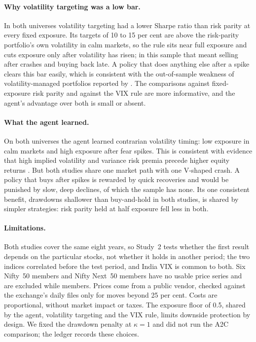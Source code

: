 \documentclass[11pt]{article}
\begin{document}
\paragraph{Why volatility targeting was a low bar.} In both universes volatility targeting had a lower Sharpe ratio than risk parity at every fixed exposure. Its targets of 10 to 15 per cent are above the risk-parity portfolio's own volatility in calm markets, so the rule sits near full exposure and cuts exposure only after volatility has risen; in this sample that meant selling after crashes and buying back late. A policy that does anything else after a spike clears this bar easily, which is consistent with the out-of-sample weakness of volatility-managed portfolios reported by \citet{cederburg2020}. The comparisons against fixed-exposure risk parity and against the VIX rule are more informative, and the agent's advantage over both is small or absent.

\paragraph{What the agent learned.} On both universes the agent learned contrarian volatility timing: low exposure in calm markets and high exposure after fear spikes. This is consistent with evidence that high implied volatility and variance risk premia precede higher equity returns \citep{whaley2000,bollerslev2009}. But both studies share one market path with one V-shaped crash. A policy that buys after spikes is rewarded by quick recoveries and would be punished by slow, deep declines, of which the sample has none. Its one consistent benefit, drawdowns shallower than buy-and-hold in both studies, is shared by simpler strategies: risk parity held at half exposure fell less in both.

\paragraph{Limitations.} Both studies cover the same eight years, so Study~2 tests whether the first result depends on the particular stocks, not whether it holds in another period; the two indices correlated \NxCorrDev{} before the test period, and India VIX is common to both. Six Nifty~50 members and \NxExcluded{} Nifty Next~50 members have no usable price series and are excluded while members. Prices come from a public vendor, checked against the exchange's daily files only for moves beyond 25 per cent. Costs are proportional, without market impact or taxes. The exposure floor of 0.5, shared by the agent, volatility targeting and the VIX rule, limits downside protection by design. We fixed the drawdown penalty at $\kappa=1$ and did not run the A2C comparison; the ledger records these choices.
\end{document}

